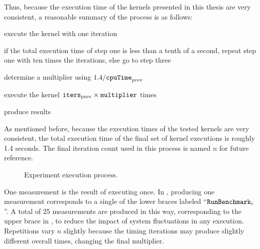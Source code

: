 \documentclass[\main/thesis.tex]{subfiles}
\begin{document}
Thus, because the execution time of the kernels presented in this thesis are very consistent, a reasonable summary of the process is as follows:
\begin{enumerate*}[itemjoin={{; }}, itemjoin*={{; }}, label=(\arabic*), after={.}]
  \item execute the kernel with one iteration
  \item if the total execution time of step one is less than a tenth of a second, repeat step one with ten times the iterations, else go to step three
  \item determine a multiplier using $1.4 / \textrm{\code{cpuTime}}_{\textrm{prev}}$
  \item execute the kernel $\textrm{\code{iters}}_{\textrm{prev}} \times \textrm{\code{multiplier}}$ times
  \item produce results
\end{enumerate*}
As mentioned before, because the execution times of the tested kernels are very consistent, the total execution time of the final set of kernel executions is roughly 1.4 seconds.
The final iteration count used in this process is named $n$ for future reference.

\begin{figure}[t]
  \centering
  \caption{Experiment execution process.}
  \label{fig:execution}
\end{figure}

One measurement is the result of executing  once.
In , producing one measurement corresponds to a single of the lower braces labeled ``$\textrm{\code{RunBenchmark}}_i$''.
A total of 25 measurements are produced in this way, corresponding to the upper brace in , to reduce the impact of system fluctuations in any execution.
Repetitions vary $n$ slightly because the timing iterations may produce slightly different overall times, changing the final multiplier.
\end{document}
